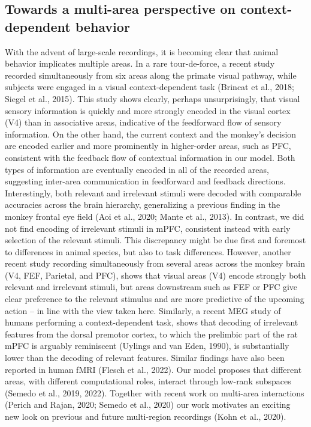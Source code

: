 \documentclass[12pt]{article}
\begin{document}
\subsection*{Towards a multi-area perspective on context-dependent behavior}
With the advent of large-scale recordings, it is becoming clear that animal behavior implicates multiple areas. In a rare tour-de-force, a recent study recorded simultaneously from six areas along the primate visual pathway, while subjects were engaged in a visual context-dependent task (Brincat et al., 2018; Siegel et al., 2015). This study shows clearly, perhaps unsurprisingly, that visual sensory information is quickly and more strongly encoded in the visual cortex (V4) than in associative areas, indicative of the feedforward flow of sensory information. On the other hand, the current context and the monkey’s decision are encoded earlier and more prominently in higher-order areas, such as PFC, consistent with the feedback flow of contextual information in our model. Both types of information are eventually encoded in all of the recorded areas, suggesting inter-area communication in feedforward and feedback directions. Interestingly, both relevant and irrelevant stimuli were decoded with comparable accuracies across the brain hierarchy, generalizing a previous finding in the monkey frontal eye field (Aoi et al., 2020; Mante et al., 2013). In contrast, we did not find encoding of irrelevant stimuli in mPFC, consistent instead with early selection of the relevant stimuli. This discrepancy might be due first and foremost to differences in animal species, but also to task differences. However, another recent study recording simultaneously from several areas across the monkey brain (V4, FEF, Parietal, and PFC), shows that visual areas (V4) encode strongly both relevant and irrelevant stimuli, but areas downstream such as FEF or PFC give clear preference to the relevant stimulus and are more predictive of the upcoming action – in line with the view taken here. Similarly, a recent MEG study of humans performing a context-dependent task, shows that decoding of irrelevant features from the dorsal premotor cortex, to which the prelimbic part of the rat mPFC is arguably reminiscent (Uylings and van Eden, 1990), is substantially lower than the decoding of relevant features. Similar findings have also been reported in human fMRI (Flesch et al., 2022). Our model proposes that different areas, with different computational roles, interact through low-rank subspaces (Semedo et al., 2019, 2022). Together with recent work on multi-area interactions (Perich and Rajan, 2020; Semedo et al., 2020) our work motivates an exciting new look on previous and future multi-region recordings (Kohn et al., 2020).
\end{document}
